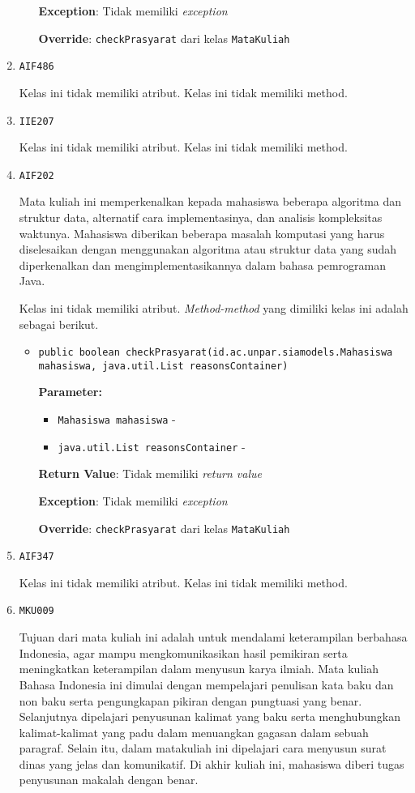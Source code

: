 \documentclass{article}
\begin{document}
\begin{enumerate}
\begin{itemize}
\textbf{Exception}: Tidak memiliki \textit{exception}

\textbf{Override}: \texttt{checkPrasyarat} dari kelas \texttt{MataKuliah}

\end{itemize}
\item \texttt{AIF486}



Kelas ini tidak memiliki atribut. Kelas ini tidak memiliki method. \item \texttt{IIE207}



Kelas ini tidak memiliki atribut. Kelas ini tidak memiliki method. \item \texttt{AIF202}

Mata kuliah ini memperkenalkan kepada mahasiswa beberapa algoritma dan 
 struktur data, alternatif cara implementasinya, dan analisis kompleksitas 
 waktunya. Mahasiswa diberikan beberapa masalah komputasi yang harus 
 diselesaikan dengan menggunakan algoritma atau struktur data yang sudah 
 diperkenalkan dan mengimplementasikannya dalam bahasa pemrograman Java.

Kelas ini tidak memiliki atribut. \textit{Method-method} yang dimiliki kelas ini adalah sebagai berikut.
\begin{itemize}
\item \texttt{public boolean checkPrasyarat(id.ac.unpar.siamodels.Mahasiswa mahasiswa, java.util.List reasonsContainer)}

\textbf{Parameter:}
\begin{itemize}
\item \texttt{Mahasiswa mahasiswa} - 
\item \texttt{java.util.List reasonsContainer} - 
\end{itemize}
\textbf{Return Value}: Tidak memiliki \textit{return value}

\textbf{Exception}: Tidak memiliki \textit{exception}

\textbf{Override}: \texttt{checkPrasyarat} dari kelas \texttt{MataKuliah}

\end{itemize}
\item \texttt{AIF347}



Kelas ini tidak memiliki atribut. Kelas ini tidak memiliki method. \item \texttt{MKU009}

Tujuan dari mata kuliah ini adalah untuk mendalami keterampilan berbahasa Indonesia, agar 
 mampu mengkomunikasikan hasil pemikiran serta meningkatkan keterampilan dalam menyusun karya
 ilmiah. Mata kuliah Bahasa Indonesia ini dimulai dengan mempelajari penulisan kata baku dan 
 non baku serta pengungkapan pikiran dengan pungtuasi yang benar. Selanjutnya dipelajari 
 penyusunan kalimat yang baku serta menghubungkan kalimat-kalimat yang padu dalam menuangkan 
 gagasan dalam sebuah paragraf. Selain itu, dalam matakuliah ini dipelajari cara menyusun
 surat dinas yang jelas dan komunikatif. Di akhir kuliah ini, mahasiswa diberi tugas
 penyusunan makalah dengan benar.


\end{enumerate}
\end{document}
